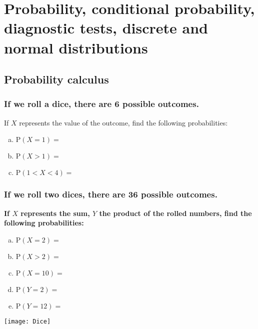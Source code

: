 \chapter[Probability and distributions]{Probability, conditional probability, diagnostic tests, discrete and normal distributions}
\renewcommand{\P}{\mathrm{P}}
\section{Probability calculus}

\subsection{If we roll a dice, there are 6 possible outcomes.}
If $X$ represents the value of the outcome, find the following probabilities: 
\begin{enumerate}[a)] 
\item $\P(X = 1)=$ \hrulefill
\item $\P(X > 1)=$ \hrulefill
\item $\P(1 < X < 4)=$ \hrulefill
\end{enumerate}


\subsection{If we roll two dices, there are 36 possible outcomes.}
	\textbf{If $X$ represents the sum, $Y$ the product of the rolled numbers, find the following probabilities:}
	
	\begin{multicols}{2}	
		\begin{enumerate}[a)] 
		\item $\P(X = 2)=$ \hrulefill
		\item $\P(X > 2)=$ \hrulefill
		\item $\P(X = 10)=$ \hrulefill
		\item $\P(Y = 2)=$ \hrulefill
		\item $\P(Y = 12)=$ \hrulefill
		\end{enumerate}
		
	\columnbreak
		
	\begin{flushright}
		\texttt{[image: Dice]}
	\end{flushright}
	\end{multicols}	

